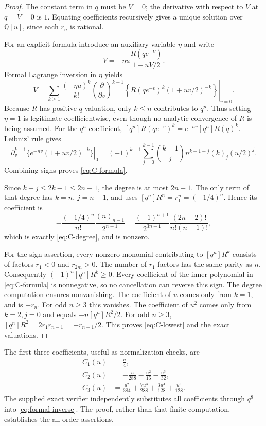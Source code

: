 \documentclass[11pt,a4paper]{article}
\numberwithin{equation}{section}
\theoremstyle{definition}\newtheorem{definition}[theorem]{Definition}
\theoremstyle{remark}\newtheorem{remark}[theorem]{Remark}
\newcommand{\Q}{\mathbb Q}\newcommand{\N}{\mathbb N}
\begin{document}
\begin{proof}
The constant term in $q$ must be $V=0$; the derivative with respect to
$V$ at $q=V=0$ is $1$. Equating coefficients recursively gives a unique
solution over $\Q[u]$, since each $r_n$ is rational.

For an explicit formula introduce an auxiliary variable $\eta$ and
write
\[
 V=-\eta u\frac{R(qe^{-V})}{1+uV/2}.
\]
Formal Lagrange inversion in $\eta$ yields
\begin{equation}\label{eq:eta-Lagrange}
 V=\sum_{k\ge1}\frac{(-\eta u)^k}{k!}
 \left.\left(\frac{\partial}{\partial v}\right)^{k-1}
 \left\{R(qe^{-v})^k(1+uv/2)^{-k}\right\}\right|_{v=0}.
\end{equation}
Because $R$ has positive $q$ valuation, only $k\le n$ contributes
to $q^n$. Thus setting $\eta=1$ is legitimate coefficientwise, even
though no analytic convergence of $R$ is being assumed.
For the $q^n$ coefficient,
$[q^n]R(qe^{-v})^k=e^{-nv}[q^n]R(q)^k$.
Leibniz' rule gives
\[
 \left.\partial_v^{k-1}\{e^{-nv}(1+uv/2)^{-k}\}\right|_0
 =(-1)^{k-1}\sum_{j=0}^{k-1}
 \binom{k-1}{j}n^{k-1-j}(k)_j(u/2)^j.
\]
Combining signs proves \eqref{eq:C-formula}.

Since $k+j\le2k-1\le2n-1$, the degree is at most $2n-1$.
The only term of that degree has $k=n$, $j=n-1$, and uses
$[q^n]R^n=r_1^n=(-1/4)^n$. Hence its coefficient is
\[
 -\frac{(-1/4)^n}{n!}\frac{(n)_{n-1}}{2^{n-1}}
 =\frac{(-1)^{n+1}}{2^{3n-1}}
   \frac{(2n-2)!}{n!(n-1)!},
\]
which is exactly \eqref{eq:C-degree}, and is nonzero.

For the sign assertion, every nonzero monomial contributing to
$[q^n]R^k$ consists of factors $r_1<0$ and $r_{2m}>0$.
The number of $r_1$ factors has the same parity as $n$.
Consequently $(-1)^n[q^n]R^k\ge0$. Every coefficient of the inner
polynomial in \eqref{eq:C-formula} is nonnegative, so no cancellation
can reverse this sign. The degree computation ensures nonvanishing.
The coefficient of $u$ comes only from $k=1$, and is $-r_n$.
For odd $n\ge3$ this vanishes. The coefficient of $u^2$ comes only
from $k=2,j=0$ and equals $-n[q^n]R^2/2$.
For odd $n\ge3$, $[q^n]R^2=2r_1r_{n-1}=-r_{n-1}/2$.
This proves \eqref{eq:C-lowest} and the exact valuations.
\end{proof}

The first three coefficients, useful as normalization checks, are
\begin{align}
 C_1(u)&=\frac u4,\label{eq:C1}\\
 C_2(u)&=-\frac u{288}-\frac{u^2}{16}-\frac{u^3}{32},
 \label{eq:C2}\\
 C_3(u)&=\frac{u^2}{384}+\frac{7u^3}{288}
         +\frac{3u^4}{128}+\frac{u^5}{128}.
 \label{eq:C3}
\end{align}
The supplied exact verifier independently substitutes all coefficients
through $q^8$ into \eqref{eq:formal-inverse}. The proof, rather than
that finite computation, establishes the all-order assertions.
\end{document}
